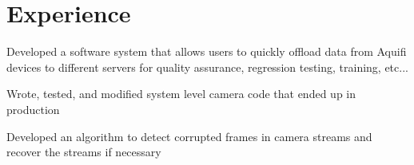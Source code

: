 \documentclass[letterpaper]{deedy-resume} %
\begin{document}
\begin{minipage}[t]{0.66\textwidth} %


\section{Experience}


\vspace{\topsep} %
\begin{tightitemize}
	\item 	Developed a software system that allows users to quickly offload data from Aquifi devices to different servers for quality assurance, regression testing, training, etc...
	\item Wrote, tested, and modified system level camera code that ended up in production
	\item Developed an algorithm to detect corrupted frames in camera streams and recover the streams if necessary 
\end{tightitemize}

\sectionspace %




\end{minipage}
\end{document}
